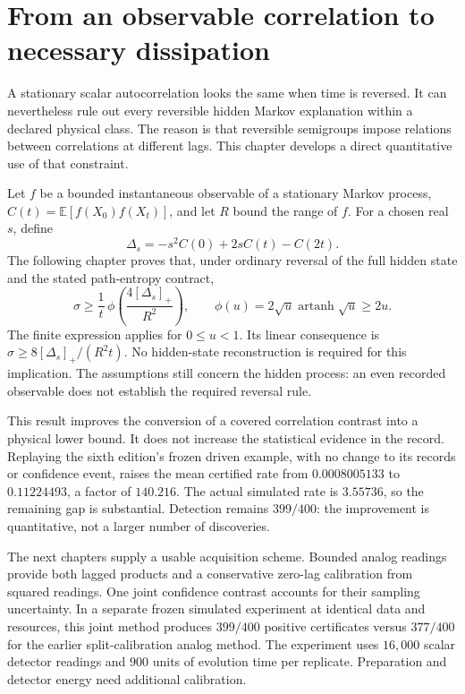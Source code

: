 \chapter{From an observable correlation to necessary dissipation}
\label{pa:entry}
A stationary scalar autocorrelation looks the same when time is reversed.
It can nevertheless rule out every reversible hidden Markov explanation
within a declared physical class. The reason is that reversible semigroups
impose relations between correlations at different lags. This chapter develops
a direct quantitative use of that constraint.

Let $f$ be a bounded instantaneous observable of a stationary Markov process,
$C(t)=\mathbb E[f(X_0)f(X_t)]$, and let $R$ bound the range of $f$.
For a chosen real $s$, define
\[
 \Delta_s=-s^2 C(0)+2s C(t)-C(2t).
\]
The following chapter proves that, under ordinary reversal of the full hidden
state and the stated path-entropy contract,
\[
 \sigma\geq\frac{1}{t}\,
 \phi\!\left(\frac{4[\Delta_s]_+}{R^2}\right),
 \qquad \phi(u)=2\sqrt u\operatorname{artanh}\sqrt u\geq2u.
\]
The finite expression applies for $0\leq u<1$. Its linear consequence is
$\sigma\geq8[\Delta_s]_+/(R^2t)$. No hidden-state reconstruction is required
for this implication. The assumptions still concern the hidden process:
an even recorded observable does not establish the required reversal rule.

This result improves the conversion of a covered correlation contrast into a
physical lower bound. It does not increase the statistical evidence in the
record. Replaying the sixth edition's frozen driven example, with no change to
its records or confidence event, raises the mean certified rate from
$0.0008005133$ to $0.11224493$, a factor of $140.216$. The actual simulated
rate is $3.55736$, so the remaining gap is substantial. Detection remains
$399/400$: the improvement is quantitative, not a larger number of discoveries.

The next chapters supply a usable acquisition scheme. Bounded analog readings
provide both lagged products and a conservative zero-lag calibration from
squared readings. One joint confidence contrast accounts for their sampling
uncertainty. In a separate frozen simulated experiment at identical data and
resources, this joint method produces $399/400$ positive certificates versus
$377/400$ for the earlier split-calibration analog method. The experiment uses
$16{,}000$ scalar detector readings and $900$ units of evolution time per
replicate. Preparation and detector energy need additional calibration.

